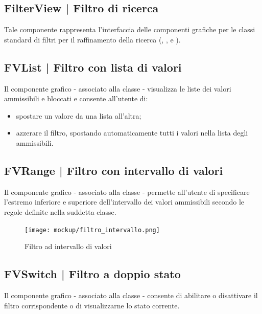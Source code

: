 \documentclass[10pt,a4paper,headinclude,footinclude,hidelinks]{scrreprt} %
\begin{document}
	\subsection[FilterView]{FilterView | Filtro di ricerca}
	\label{sec:stage:design:view.filter:filter}
	Tale componente rappresenta l'interfaccia delle componenti grafiche per le classi standard di filtri per il raffinamento della ricerca (\textit{}, \textit{}, \textit{} e \textit{}).

	\subsection[FVList]{FVList | Filtro con lista di valori}
	\label{sec:stage:design:view.filter:list-filter}
	Il componente grafico - associato alla classe \textit{} - visualizza le liste dei valori ammissibili e bloccati e consente all'utente di:
	\begin{itemize}
	\item spostare un valore da una lista all'altra;
	\item azzerare il filtro, spostando automaticamente tutti i valori nella lista degli ammissibili.
	\end{itemize}

	\subsection[FVRange]{FVRange | Filtro con intervallo di valori}
	\label{sec:stage:design:view.filter:range-filter}
	Il componente grafico - associato alla classe \textit{} - permette all'utente di specificare l'estremo inferiore e superiore dell'intervallo dei valori ammissibili secondo le regole definite nella suddetta classe.

	\begin{figure}[ht]
		\begin{center}
	    	\texttt{[image: mockup/filtro\_intervallo.png]}
			\label{gfx:mockup:filter:range}
			\caption{Filtro ad intervallo di valori}
		\end{center}
	\end{figure}

	\subsection[FVSwitch]{FVSwitch | Filtro a doppio stato}
	\label{sec:stage:design:view.filter:switch-filter}
	Il componente grafico - associato alla classe \textit{} - consente di abilitare o disattivare il filtro corrispondente o di visualizzarne lo stato corrente.
\end{document}
